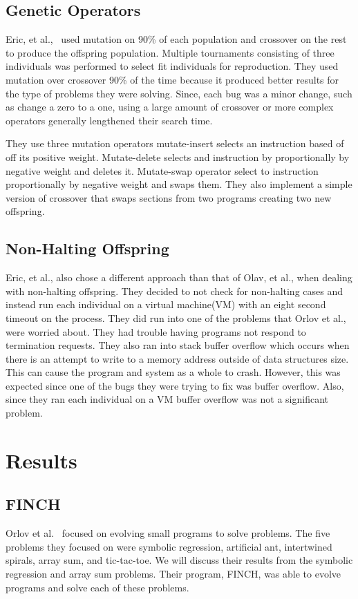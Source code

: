 \documentclass{sig-alternate}
\begin{document}
\subsection{Genetic Operators}
Eric, et al.,~\cite{Assembly:2010} used mutation on 90\% of each population and crossover on the rest to produce the offspring population. Multiple tournaments consisting of three individuals was performed to select fit individuals for reproduction. They used mutation over crossover 90\% of the time because it produced better results for the type of problems they were solving. Since, each bug was a minor change, such as change a zero to a one, using a large amount of crossover or more complex operators generally lengthened their search time.

They use three mutation operators mutate-insert selects an instruction based of off its positive weight. Mutate-delete selects and instruction by proportionally by negative weight and deletes it. Mutate-swap operator select to instruction proportionally by negative weight and swaps them. They also implement a simple version of crossover that swaps sections from two programs creating two new offspring.

\subsection{Non-Halting Offspring}

Eric, et al., also chose a different approach than that of Olav, et al., when dealing with non-halting offspring. They decided to not check for non-halting cases and instead run each individual on a virtual machine(VM) with an eight second timeout on the process. They did run into one of the problems that Orlov et al., were worried about. They had trouble having programs not respond to termination requests.
They also ran into stack buffer overflow which occurs when there is an attempt to write to a memory address outside of data structures size. This can cause the program and system as a whole to crash. However, this was expected since one of the bugs they were trying to fix was buffer overflow. Also, since they ran each individual on a VM buffer overflow was not a significant problem.




\section{Results}
\subsection{FINCH}
Orlov et al.~\cite{FINCH:2011} focused on evolving small programs to solve problems. The five problems they focused on were symbolic regression, artificial ant, intertwined spirals, array sum, and tic-tac-toe. We will discuss their results from the symbolic regression and array sum problems. Their program, FINCH, was able to evolve programs and solve each of these problems.
\end{document}
